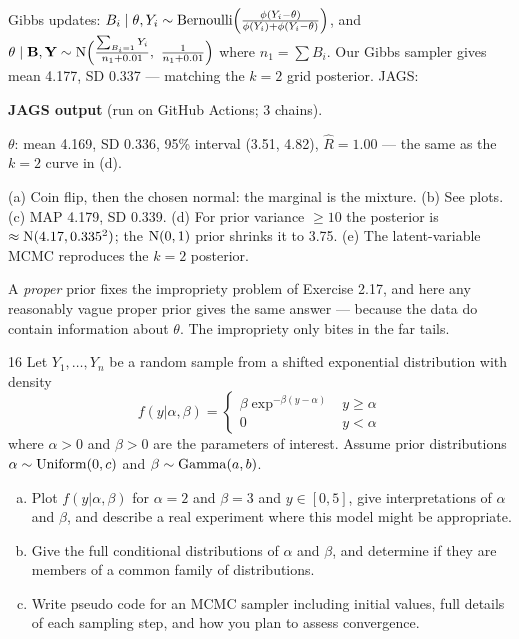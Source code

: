 \documentclass[11pt]{article}
\newenvironment{jagsbox}{\begin{sanity}\small\textbf{JAGS output} (run on GitHub Actions; 3 chains).\par\smallskip\centering}{\end{sanity}}
\newcommand{\JAGSexfifteen}{\begin{jagsbox}
$\theta$: mean 4.169, SD 0.336, 95\% interval (3.51, 4.82), $\hat R=1.00$ --- the same as the $k=2$ curve in (d).
\end{jagsbox}}
\begin{document}
Gibbs updates: $B_i\mid\theta,Y_i\sim\mathrm{Bernoulli}\Big(\frac{\phi(Y_i-\theta)}{\phi(Y_i)+\phi(Y_i-\theta)}\Big)$, and $\theta\mid\mathbf B,\mathbf Y\sim\mathrm{N}\Big(\frac{\sum_{B_i=1}Y_i}{n_1+0.01},\ \frac{1}{n_1+0.01}\Big)$ where $n_1=\sum B_i$.
Our Gibbs sampler gives mean 4.177, SD 0.337 --- matching the $k=2$ grid posterior. JAGS:
\JAGSexfifteen

\begin{answer}
(a) Coin flip, then the chosen normal: the marginal is the mixture. (b) See plots. (c) MAP 4.179, SD 0.339. (d) For prior variance $\ge10$ the posterior is $\approx\mathrm{N}(4.17,0.335^2)$; the $\mathrm{N}(0,1)$ prior shrinks it to 3.75. (e) The latent-variable MCMC reproduces the $k=2$ posterior.
\end{answer}

\begin{takeaway}
A \emph{proper} prior fixes the impropriety problem of Exercise 2.17, and here any reasonably vague proper prior gives the same answer --- because the data do contain information about $\theta$. The impropriety only bites in the far tails.
\end{takeaway}


\begin{problem}{16}
Let $Y_1,\dots,Y_n$ be a random sample from a shifted exponential distribution with density
\[
f(y|\alpha,\beta)=\begin{cases}\beta\exp^{-\beta(y-\alpha)} & y\ge\alpha\\ 0 & y<\alpha\end{cases}
\]
where $\alpha>0$ and $\beta>0$ are the parameters of interest. Assume prior distributions $\alpha\sim\mathrm{Uniform}(0,c)$ and $\beta\sim\mathrm{Gamma}(a,b)$.
\begin{enumerate}[(a)]
\item Plot $f(y|\alpha,\beta)$ for $\alpha=2$ and $\beta=3$ and $y\in[0,5]$, give interpretations of $\alpha$ and $\beta$, and describe a real experiment where this model might be appropriate.
\item Give the full conditional distributions of $\alpha$ and $\beta$, and determine if they are members of a common family of distributions.
\item Write pseudo code for an MCMC sampler including initial values, full details of each sampling step, and how you plan to assess convergence.
\end{enumerate}
\end{problem}
\end{document}
